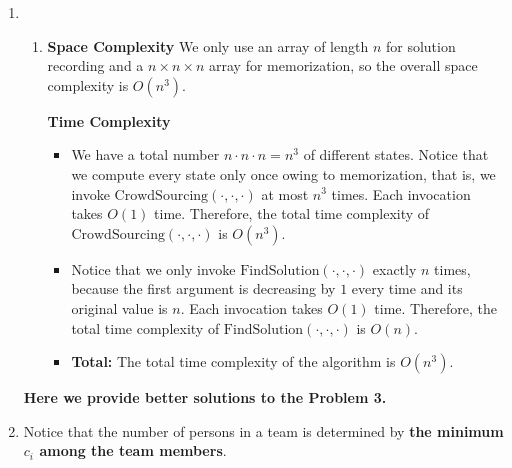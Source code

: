 \documentclass[12pt,a4paper]{article}
\makeatletter
\newtheorem*{solution}{Solution}
\theoremstyle{definition}
\renewenvironment{solution}[1][Solution] {\par\pushQED{\qed}\normalfont\topsep6\p@\@plus6\p@\relax\trivlist\item[\hskip\labelsep\bfseries#1\@addpunct{.}]\ignorespaces}{\popQED\endtrivlist\@endpefalse} \makeatother
\makeatother
\begin{document}
\begin{enumerate}
\begin{solution}
\begin{enumerate}
    \begin{minipage}[t]{0.9\textwidth}
        \begin{algorithm}[H]
            \caption{FindSolution(i, b, c)}
            \label{DP-3}
             {
                \Return{$\varnothing$};
            }
             {
                 {
                    ;
                }
            }
            ;
        \end{algorithm}
    \end{minipage}
    \item \textbf{Space Complexity} We only use an array of length $n$ for solution recording and a $n \times n \times n$ array for memorization, so the overall space complexity is $O(n^3)$.

    \textbf{Time Complexity}
    \begin{itemize}
    \item We have a total number $n \cdot n \cdot n = n^3$ of different states. Notice that we compute every state only once owing to memorization, that is, we invoke $\mathrm{CrowdSourcing}(\cdot, \cdot, \cdot)$ at most $n^3$ times. Each invocation takes $O(1)$ time. Therefore, the total time complexity of $\mathrm{CrowdSourcing}(\cdot, \cdot, \cdot)$ is $O(n^3)$.
    \item Notice that we only invoke $\mathrm{FindSolution}(\cdot, \cdot, \cdot)$ exactly $n$ times, because the first argument is decreasing by $1$ every time and its original value is $n$. Each invocation takes $O(1)$ time. Therefore, the total time complexity of $\mathrm{FindSolution}(\cdot, \cdot, \cdot)$ is $O(n)$.
    \item \textbf{Total: } The total time complexity of the algorithm is $O(n^3)$.
    \end{itemize}
    \end{enumerate}
    \end{solution}

    \textbf{\color{red} Here we provide better solutions to the Problem 3.}
    \begin{solution}
        Notice that the number of persons in a team is determined by \textbf{the minimum $c_i$ among the team members}.


\end{solution}
\end{enumerate}
\end{document}
